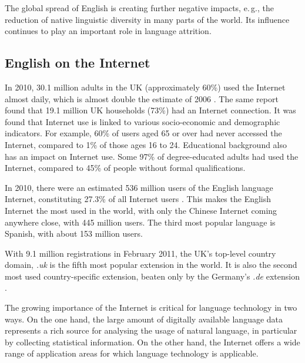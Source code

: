 \documentclass[]{../../metanetpaper}
\begin{document}
\begin{multicols}{2}
The global spread of English is creating further negative impacts, e.\,g., the reduction of native linguistic diversity in many parts of the world. Its influence continues to play an important role in language attrition.

  
\subsection{English on the Internet}

In 2010, 30.1 million adults in the UK (approximately 60\%) used the Internet almost daily, which is almost double the estimate of 2006 \cite{stats1}.  The same report found that 19.1 million UK households (73\%) had an Internet connection. It was found that Internet use is linked to various socio-economic and demographic indicators. For example, 60\% of users aged 65 or over had never accessed the Internet, compared to 1\% of those ages 16 to 24. Educational background also has an impact on Internet use. Some 97\% of degree-educated adults had used the Internet, compared to 45\% of people without formal qualifications.

In 2010, there were an estimated 536 million users of the English language Internet, constituting 27.3\% of all Internet users \cite{stats2}. This makes the English Internet the most used in the world, with only the Chinese Internet coming anywhere close, with 445 million users. The third most popular language is Spanish, with about 153 million users.
  
    
With 9.1 million registrations in February 2011, the UK's top-level country domain, \textit{.uk} is the fifth most popular extension in the world. It is also the second most used country-specific extension, beaten only by the Germany's \textit{.de} extension \cite{stats3}.
    
The growing importance of the Internet is critical for language technology in two ways. On the one hand, the large amount of digitally available language data represents a rich source for analysing the usage of natural language, in particular by collecting statistical information. On the other hand, the Internet offers a wide range of application areas for which language technology is applicable.



\end{multicols}
\end{document}
